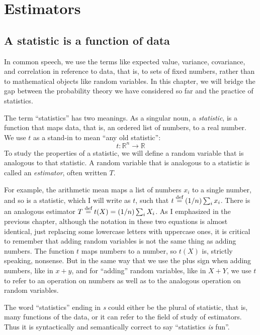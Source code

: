 
\chapter{Estimators}

\section{A statistic is a function of data}

In common speech, we use the terms like expected value, variance, covariance, and
correlation in reference to data, that is, to sets of fixed numbers, rather than
to mathematical objects like random variables. In this chapter, we will bridge the
gap between the probability theory we have considered so far and the practice of
statistics.

The term ``statistics'' has two meanings. As a singular noun, a \emph{statistic},
is a function that maps data, that is, an ordered list of numbers, to a real
number. We use $t$ as a stand-in to mean ``any old statistic'':
\begin{equation*}
    t : \mathbb{R}^n \to \mathbb{R}
\end{equation*}
To study the properties of a statistic, we will define a random variable that is
analogous to that statistic. A random variable that is analogous to a statistic is
called an \emph{estimator}, often written $T$.

For example, the arithmetic mean maps a list of numbers $x_i$ to a single number, and
so is a statistic, which I will write as $t$, such that $t \stackrel{\text{def}}{=} (1/n) \sum_i x_i$.
There is an analogous estimator $T \stackrel{\text{def}}{=} t(X) = (1/n) \sum_i X_i$. As I emphasized in the
previous chapter, although the notation in these two equations is almost identical,
just replacing some lowercase letters with uppercase ones, it is critical to remember
that adding random variables is not the same thing as adding numbers. The function
$t$ maps numbers to a number, so $t(X)$ is, strictly speaking, nonsense. But in the
same way that we use the plus sign when adding numbers, like in $x + y$, and for
``adding'' random variables, like in $X + Y$, we use $t$ to refer to an operation on
numbers as well as to the analogous operation on random variables.

The word ``statistics'' ending in \textit{s} could either be the plural of statistic,
that is, many functions of the data, or it can refer to the field of study of
estimators. Thus it is syntactically and semantically correct to say ``statistics
\textit{is} fun''.

